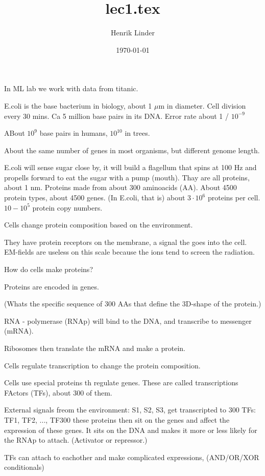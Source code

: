 \documentclass{article}
\title{lec1.tex }
\author{Henrik Linder}
\date{\today}
\begin{document}
\maketitle



In ML lab we work with data from titanic.

E.coli is the base bacterium in biology, about 1 $\mu$m in diameter. Cell division every 30 mins. Ca 5 million base pairs in its DNA. Error rate about 1 / $10 ^{-9}$

ABout $10 ^{9}$ base pairs in humans, $10 ^{10}$ in trees. 

About the same number of genes in most organisms, but different genome length. 


E.coli will sense sugar close by, it will build a flagellum that spins at 100 Hz and propells forward to eat the sugar with a pump (mouth). Thay are all proteins, about 1 nm. Proteins made from about 300 aminoacids (AA). About 4500 protein types, about 4500 genes. (In E.coli, that is)
about $3\cdot 10^{6}$ proteins per cell. 
$10 - 10^{5}$ protein copy numbers. 

Cells change protein composition based on the environment. 

They have protein receptors on the membrane, a signal the goes into the cell. EM-fields are useless on this scale because the ions tend to screen the radiation.

How do cells make proteins? 

Proteins are encoded in genes. 

(Whats the specific sequence of 300 AAs that define the 3D-shape of the protein.)


RNA - polymerase (RNAp) will bind to the DNA, and transcribe to messenger (mRNA). 

Ribosomes then translate the mRNA and make a protein. 

Cells regulate transcription to change the protein composition.

Cells use special proteins th regulate genes. These are called transcriptions FActors (TFs), about 300 of them. 

External signals freom the environment: S1, S2, S3, get transcripted to 300 TFs: TF1, TF2, ..., TF300 
these proteins then sit on the genes and affect the expression of these genes. It sits on the DNA and makes it more or less likely for the RNAp to attach. (Activator or repressor.)

TFs can attach to eachother and make complicated expressions, (AND/OR/XOR conditionals)
\end{document}
